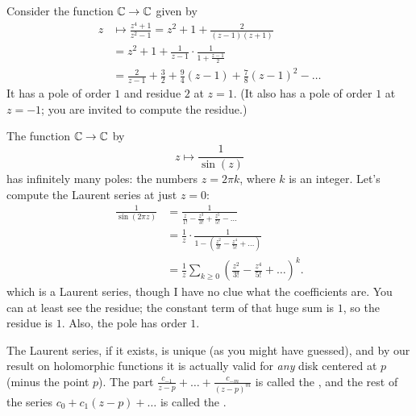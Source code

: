 \begin{example}
	Consider the function $\mathbb C \to \mathbb C$ given by
	\begin{align*}
		z &\mapsto \frac{z^4+1}{z^2-1} = z^2 + 1 + \frac{2}{(z-1)(z+1)} \\
		&= z^2 + 1 + \frac1{z-1} \cdot \frac{1}{1+\frac{z-1}{2}} \\
		&= \frac{2}{z-1} + \frac32 + \frac94(z-1) + \frac{7}{8}(z-1)^2 - \dots
	\end{align*}
	It has a pole of order $1$ and residue $2$ at $z=1$.
	(It also has a pole of order $1$ at $z=-1$; you are invited to compute the residue.)
\end{example}
\begin{example}
	The function $\mathbb C \to \mathbb C$ by \[ z \mapsto \frac{1}{\sin(z)} \]
	has infinitely many poles: the numbers $z = 2\pi k$, where $k$ is an integer.
	Let's compute the Laurent series at just $z=0$:
	\begin{align*}
		\frac{1}{\sin(2\pi z)}
		&= \frac{1}{\frac{z}{1!} - \frac{z^3}{3!} + \frac{z^5}{5!} - \dots} \\
		&= \frac 1z \cdot \frac{1}{1 - \left( \frac{z^2}{3!} - \frac{z^4}{5!} + \dots \right)} \\
		&= \frac 1z \sum_{k \ge 0} \left( \frac{z^2}{3!} - \frac{z^4}{5!} + \dots \right)^k.
	\end{align*}
	which is a Laurent series, though I have no clue what the coefficients are.
	You can at least see the residue; the constant term of that huge sum is $1$,
	so the residue is $1$.
	Also, the pole has order $1$.
\end{example}

The Laurent series, if it exists, is unique (as you might have guessed),
and by our result on holomorphic functions it is actually valid for \emph{any}
disk centered at $p$ (minus the point $p$).
The part $\frac{c_{-1}}{z-p} + \dots + \frac{c_{-m}}{(z-p)^m}$ is called the ,
and the rest of the series $c_0 + c_1(z-p) + \dots$ is called the .



